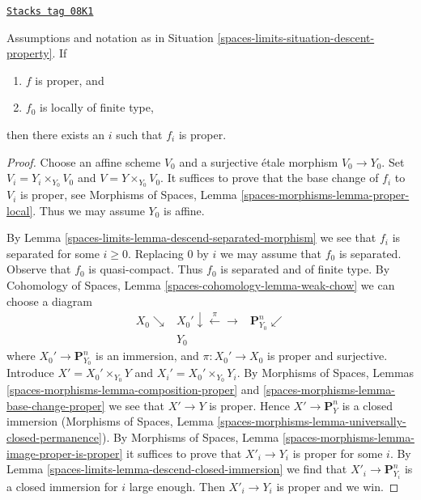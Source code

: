 \begin{lemma}
\label{spaces-limits-lemma-eventually-proper}
\href{https://stacks.math.columbia.edu/tag/08K1}{\texttt{Stacks tag 08K1}}

Assumptions and notation as in Situation \ref{spaces-limits-situation-descent-property}.
If
\begin{enumerate}
\item $f$ is proper, and
\item $f_0$ is locally of finite type,
\end{enumerate}
then there exists an $i$ such that $f_i$ is proper.
\end{lemma}

\begin{proof}
Choose an affine scheme $V_0$ and a surjective \'etale morphism $V_0 \to Y_0$.
Set $V_i = Y_i \times_{Y_0} V_0$ and $V = Y \times_{Y_0} V_0$.
It suffices to prove that the base change of $f_i$ to $V_i$ is
proper, see Morphisms of Spaces, Lemma
\ref{spaces-morphisms-lemma-proper-local}.
Thus we may assume $Y_0$ is affine.

\medskip\noindent
By Lemma \ref{spaces-limits-lemma-descend-separated-morphism} we see that
$f_i$ is separated for some $i \geq 0$. Replacing
$0$ by $i$ we may assume that $f_0$ is separated.
Observe that $f_0$ is quasi-compact. Thus $f_0$ is separated and
of finite type. By
Cohomology of Spaces, Lemma \ref{spaces-cohomology-lemma-weak-chow}
we can choose a diagram
$$
\begin{array}{ccc}X_0 \searrow & X_0' \downarrow\overset{\pi}{\longleftarrow}\longrightarrow & \mathbf{P}^n_{Y_0} \swarrow \\  & Y_0 & \end{array}
$$
where $X_0' \to \mathbf{P}^n_{Y_0}$ is an immersion, and
$\pi : X_0' \to X_0$ is proper and surjective. Introduce
$X' = X_0' \times_{Y_0} Y$ and $X_i' = X_0' \times_{Y_0} Y_i$.
By Morphisms of Spaces, Lemmas
\ref{spaces-morphisms-lemma-composition-proper} and
\ref{spaces-morphisms-lemma-base-change-proper}
we see that $X' \to Y$ is proper. Hence $X' \to \mathbf{P}^n_Y$ is
a closed immersion (Morphisms of Spaces, Lemma
\ref{spaces-morphisms-lemma-universally-closed-permanence}). By
Morphisms of Spaces, Lemma \ref{spaces-morphisms-lemma-image-proper-is-proper}
it suffices to prove that $X'_i \to Y_i$ is proper for some $i$.
By Lemma \ref{spaces-limits-lemma-descend-closed-immersion}
we find that $X'_i \to \mathbf{P}^n_{Y_i}$ is
a closed immersion for $i$ large enough. Then $X'_i \to Y_i$
is proper and we win.
\end{proof}

